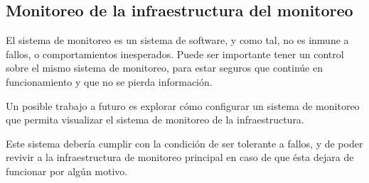 \subsection{Monitoreo de la infraestructura del monitoreo}
\label{del-monitoreo}

El sistema de monitoreo es un sistema de software, y como tal, no es inmune a
fallos,  o comportamientos inesperados. Puede ser importante tener un
control sobre el mismo sistema de monitoreo, para estar seguros que continúe en
funcionamiento y que no se pierda información.

Un posible trabajo a futuro es explorar cómo configurar un sistema de monitoreo
que permita visualizar el sistema de monitoreo de la infraestructura.

Este sistema debería cumplir con la condición de ser tolerante a fallos, y de
poder revivir a la infraestructura de monitoreo principal en caso de que ésta
dejara de funcionar por algún motivo.
